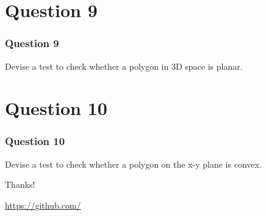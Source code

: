 \documentclass{beamer}
\begin{document}
\section{Question 9}

\begin{frame}
    \frametitle{Question 9}
    Devise a test to check whether a polygon in 3D space is planar.
\end{frame}

\section{Question 10}

\begin{frame}
    \frametitle{Question 10}

    Devise a test to check whether a polygon on the x-y plane is convex.
\end{frame}

\ThankYou
\begin{frame}
    Thanks!
 \vfill\scalebox{4}{\faGithub}\par\bigskip
 \url{https://github.com/}
\end{frame}
\end{document}
